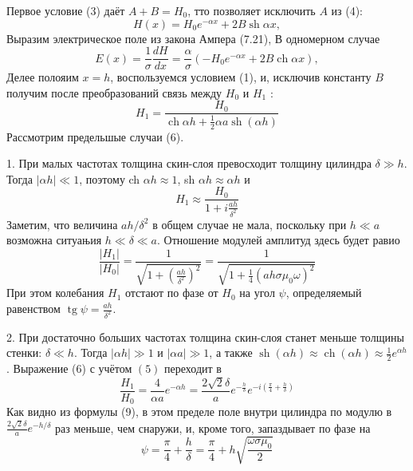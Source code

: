 \documentclass[a4paper, 12pt]{article}
\begin{document}
Первое условие (3) даёт $A+B=H_0$, тто позволяет исключить $A$ из (4):
$$
H(x)=H_0 e^{-\alpha x}+2 B \operatorname{sh} \alpha x,
$$
Выразим электрическое поле из закона Ампера (7.21), В одномерном случае
$$
E(x)=\frac{1}{\sigma} \frac{d H}{d x}=\frac{\alpha}{\sigma}\left(-H_0 e^{-\alpha x}+2 B \operatorname{ch} \alpha x\right),
$$
Делее полояим $x=h$, воспользуемся условием (1), и, исключив константу $B$ получим после преобразований связь между $H_0$ и $H_1$ :
\begin{equation}
H_1=\frac{H_0}{\operatorname{ch} \alpha h+\frac{1}{2} \alpha a \operatorname{sh}(\alpha h)}
\end{equation}
Рассмотрим предельшые случаи (6).

1. При малых частотах толщина скин-слоя превосходит толщину цилиндра $\delta \gg h$. Тогда $|\alpha h| \ll 1$, поэтому ch $\alpha h \approx 1$, sh $\alpha h \approx \alpha h$ и
\begin{equation}
	H_1 \approx \frac{H_0}{1+i \frac{a h}{\delta^2}}
\end{equation}
Заметим, что величина $a h / \delta^2$ в общем случае не мала, поскольку при $h \ll a$ возможна ситуањия $h \ll \delta \ll a$. Отношение модулей амплитуд здесь будет равио
\begin{equation}
	\frac{\left|H_1\right|}{\left|H_0\right|}=\frac{1}{\sqrt{1+\left(\frac{a h}{\delta^2}\right)^2}}=\frac{1}{\sqrt{1+\frac{1}{4}\left(a h \sigma \mu_0 \omega\right)^2}}
\end{equation}
При этом колебания $H_1$ отстают по фазе от $H_0$ на угол $\psi$, определяемый равенством $\operatorname{tg} \psi=\frac{a h}{\delta^2}$.

2. При достаточно больших частотах толщина скин-слоя станет меньше толщины стенки: $\delta \ll h$. Тогда $|\alpha h| \gg 1$ и $|\alpha a| \gg 1$, а также $\operatorname{sh}(\alpha h) \approx \operatorname{ch}(\alpha h) \approx \frac{1}{2} e^{\alpha h}$. Выражение (6) с учётом $(5)$ переходит в
\begin{equation}
\frac{H_1}{H_0}=\frac{4}{\alpha a} e^{-\alpha h}=\frac{2 \sqrt{2} \delta}{a} e^{-\frac{h}{\delta}} e^{-i\left(\frac{\pi}{4}+\frac{h}{\delta}\right)}
\end{equation}
Как видно из формулы (9), в этом пределе поле внутри цилиндра по модулю в $\frac{2 \sqrt{2} \delta}{a} e^{-h / \delta}$ раз меньше, чем снаружи, и, кроме того, запаздывает по фазе на
\begin{equation}
\psi=\frac{\pi}{4}+\frac{h}{\delta}=\frac{\pi}{4}+h \sqrt{\frac{\omega \sigma \mu_0}{2}}
\end{equation}
\end{document}
